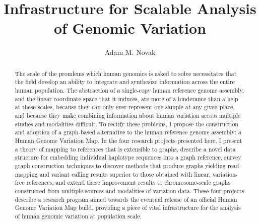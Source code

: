 
\title{Infrastructure for Scalable Analysis of Genomic Variation}
\author{Adam M. Novak}
\deanlinethree{}

\begin{frontmatter}

\maketitle
\copyrightpage

\tableofcontents
\listoffigures
\listoftables

\begin{abstract}
The scale of the promlems which human genomics is asked to solve necessitates that the field develop an ability to integrate and synthesize information across the entire human population. The abstraction of a single-copy human reference genome assembly, and the linear coordinate space that it induces, are more of a hinderance than a help at these scales, because they can only ever represent one sample at any given place, and because they make combining information about human variation across multiple studies and modalities difficult. To rectify these problems, I propose the construction and adoption of a graph-based alternative to the human reference genome assembly: a Human Genome Variation Map. In the four research projects presented here, I present a theory of mapping to references that is extensible to graphs, describe a novel data structure for embedding individual haplotype sequences into a graph reference, survey graph construction techniques to discover methods that produce graphs yielding read mapping and variant calling results superior to those obtained with linear, variation-free references, and extend these improvement results to chromosome-scale graphs constructed from multiple sources and modalities of variation data. These four projects describe a research program aimed towards the eventual release of an official Human Genome Variation Map build, providing a piece of vital infrastructure for the analysis of human genomic variation at population scale.
\end{abstract}


\end{frontmatter}
